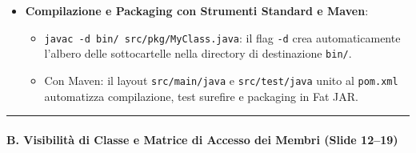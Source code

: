 \documentclass[11pt,a4paper]{article}
\newcommand{\passthrough}[1]{#1}
\providecommand{\tightlist}{\setlength{\itemsep}{0pt}\setlength{\parskip}{0pt}}
\begin{document}
\begin{itemize}
  \begin{itemize}
  \tightlist
  \item
    Se un file \passthrough{\lstinline!.java!} omette la dichiarazione
    \passthrough{\lstinline!package!}, la classe appartiene al package
    predefinito senza nome.
  \item
    \textbf{Limitazione critica}: Le classi nel default package
    \textbf{non possono essere importate né utilizzate} da classi
    situate in package con nome. Nel software professionale e agli esami
    il suo uso è fortemente scoraggiato.
  \end{itemize}
\item
  \textbf{Compilazione e Packaging con Strumenti Standard e Maven}:

  \begin{itemize}
  \tightlist
  \item
    \passthrough{\lstinline!javac -d bin/ src/pkg/MyClass.java!}: il
    flag \passthrough{\lstinline!-d!} crea automaticamente l'albero
    delle sottocartelle nella directory di destinazione
    \passthrough{\lstinline!bin/!}.
  \item
    Con Maven: il layout \passthrough{\lstinline!src/main/java!} e
    \passthrough{\lstinline!src/test/java!} unito al
    \passthrough{\lstinline!pom.xml!} automatizza compilazione, test
    surefire e packaging in Fat JAR.
  \end{itemize}
\end{itemize}

\begin{center}\rule{0.5\linewidth}{0.5pt}\end{center}

\paragraph{B. Visibilità di Classe e Matrice di Accesso dei Membri
(Slide
12--19)}\label{b.-visibilituxe0-di-classe-e-matrice-di-accesso-dei-membri-slide-1219}
\end{document}
